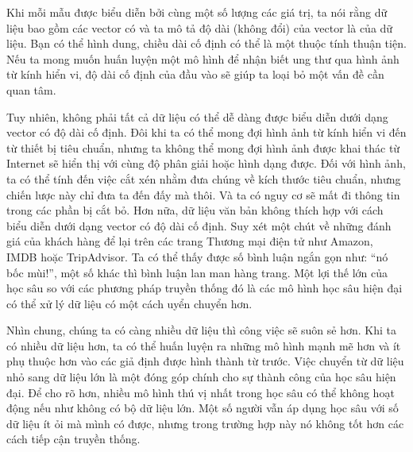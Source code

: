 \documentclass[letterpaper,11pt,english]{sphinxmanual}
\begin{document}
Khi mỗi mẫu được biểu diễn bởi cùng một số lượng các giá trị, ta nói
rằng dữ liệu bao gồm các vector có  và ta mô tả độ dài
(không đổi) của vector là  của dữ liệu. Bạn có thể hình dung,
chiều dài cố định có thể là một thuộc tính thuận tiện. Nếu ta mong muốn
huấn luyện một mô hình để nhận biết ung thư qua hình ảnh từ kính hiển
vi, độ dài cố định của đầu vào sẽ giúp ta loại bỏ một vấn đề cần quan
tâm.



Tuy nhiên, không phải tất cả dữ liệu có thể dễ dàng được biểu diễn dưới
dạng vector có độ dài cố định. Đôi khi ta có thể mong đợi hình ảnh từ
kính hiển vi đến từ thiết bị tiêu chuẩn, nhưng ta không thể mong đợi
hình ảnh được khai thác từ Internet sẽ hiển thị với cùng độ phân giải
hoặc hình dạng được. Đối với hình ảnh, ta có thể tính đến việc cắt xén
nhằm đưa chúng về kích thước tiêu chuẩn, nhưng chiến lược này chỉ đưa ta
đến đấy mà thôi. Và ta có nguy cơ sẽ mất đi thông tin trong các phần bị
cắt bỏ. Hơn nữa, dữ liệu văn bản không thích hợp với cách biểu diễn dưới
dạng vector có độ dài cố định. Suy xét một chút về những đánh giá của
khách hàng để lại trên các trang Thương mại điện tử như Amazon, IMDB
hoặc TripAdvisor. Ta có thể thấy được số bình luận ngắn gọn như: “nó bốc
mùi!”, một số khác thì bình luận lan man hàng trang. Một lợi thế lớn của
học sâu so với các phương pháp truyền thống đó là các mô hình học sâu
hiện đại có thể xử lý dữ liệu có  một cách uyển chuyển
hơn.



Nhìn chung, chúng ta có càng nhiều dữ liệu thì công việc sẽ suôn sẻ hơn.
Khi ta có nhiều dữ liệu hơn, ta có thể huấn luyện ra những mô hình mạnh
mẽ hơn và ít phụ thuộc hơn vào các giả định được hình thành từ trước.
Việc chuyển từ dữ liệu nhỏ sang dữ liệu lớn là một đóng góp chính cho sự
thành công của học sâu hiện đại. Để cho rõ hơn, nhiều mô hình thú vị
nhất trong học sâu có thể không hoạt động nếu như không có bộ dữ liệu
lớn. Một số người vẫn áp dụng học sâu với số dữ liệu ít ỏi mà mình có
được, nhưng trong trường hợp này nó không tốt hơn các cách tiếp cận
truyền thống.
\end{document}
